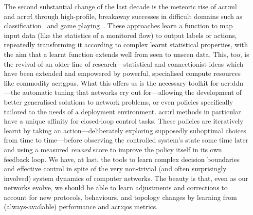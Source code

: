 The second substantial change of the last decade is the meteoric rise of \gls{acr:ml} and \gls{acr:rl} through high-profile, breakaway successes in difficult domains such as classification~\parencite{DBLP:conf/cvpr/HeZRS16} and game playing~\parencite{DBLP:journals/corr/abs-1912-06680,DBLP:journals/nature/SilverSSAHGHBLB17}.
These approaches learn a function to map input data (like the statistics of a monitored flow) to output labels or actions, repeatedly transforming it according to complex learnt statistical properties, with the aim that a learnt function extends well from seen to unseen data.
This, too, is the revival of an older line of research---statistical and connectionist ideas which have been extended and empowered by powerful, specialised compute resources like commodity \glspl{acr:gpu}.
What this offers us is the necessary toolkit for \gls{acr:ddn}---the automatic tuning that networks cry out for---allowing the development of better generalised solutions to network problems, or even policies specifically tailored to the needs of a deployment environment.
\gls{acr:rl} methods in particular have a unique affinity for closed-loop control tasks.
These policies are iteratively learnt by taking an action---deliberately exploring supposedly suboptimal choices from time to time---before observing the controlled system's state some time later and using a measured \emph{reward} score to improve the policy itself in its own feedback loop.
We have, at last, the tools to learn complex decision boundaries and effective control in spite of the very non-trivial (and often surprisingly involved) system dynamics of computer networks.
The beauty is that, even as our networks evolve, we should be able to learn adjustments and corrections to account for new protocols, behaviours, and topology changes by learning from (always-available) performance and \gls{acr:qos} metrics.


